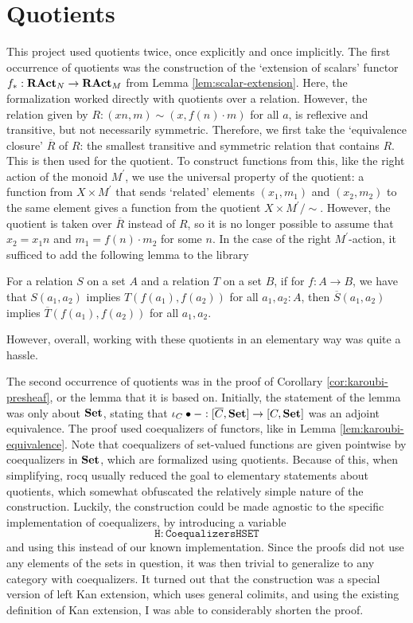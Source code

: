 \section{Quotients}\label{sec:quotients}
This project used quotients twice, once explicitly and once implicitly. The first occurrence of quotients was the construction of the `extension of scalars' functor $ f_*: \mathbf{RAct}_{N} \to \mathbf{RAct}_{M} $ from Lemma \ref{lem:scalar-extension}. Here, the formalization worked directly with quotients over a relation. However, the relation given by $ R : (x n, m) \sim (x, f(n) \cdot m) $ for all $ a $, is reflexive and transitive, but not necessarily symmetric. Therefore, we first take the `equivalence closure' $ \overline R $ of $ R $: the smallest transitive and symmetric relation that contains $ R $. This is then used for the quotient. To construct functions from this, like the right action of the monoid $ M^\prime $, we use the universal property of the quotient: a function from $ X \times M^\prime $ that sends `related' elements $ (x_1, m_1) $ and $ (x_2, m_2) $ to the same element gives a function from the quotient $ X \times M^\prime / \sim $. However, the quotient is taken over $ \overline R $ instead of $ R $, so it is no longer possible to assume that $ x_2 = x_1 n $ and $ m_1 = f(n) \cdot m_2 $ for some $ n $. In the case of the right $ M^\prime $-action, it sufficed to add the following lemma to the library
\begin{lemma}
  For a relation $ S $ on a set $ A $ and a relation $ T $ on a set $ B $, if for $ f: A \to B $, we have that $ S(a_1, a_2) $ implies $ T(f(a_1), f(a_2)) $ for all $ a_1, a_2 : A $, then $ \overline S(a_1, a_2) $ implies $ \overline T(f(a_1), f(a_2)) $ for all $ a_1, a_2 $.
\end{lemma}
However, overall, working with these quotients in an elementary way was quite a hassle.

The second occurrence of quotients was in the proof of Corollary \ref{cor:karoubi-presheaf}, or the lemma that it is based on. Initially, the statement of the lemma was only about $ \mathbf{Set} $, stating that $ \iota_C \bullet - : [\overline C, \mathbf{Set}] \to [C, \mathbf{Set}] $ was an adjoint equivalence. The proof used coequalizers of functors, like in Lemma \ref{lem:karoubi-equivalence}. Note that coequalizers of set-valued functions are given pointwise by coequalizers in $ \mathbf{Set} $, which are formalized using quotients. Because of this, when simplifying, rocq usually reduced the goal to elementary statements about quotients, which somewhat obfuscated the relatively simple nature of the construction. Luckily, the construction could be made agnostic to the specific implementation of coequalizers, by introducing a variable
\[ \mathtt{H : Coequalizers HSET} \]
and using this instead of our known implementation. Since the proofs did not use any elements of the sets in question, it was then trivial to generalize to any category with coequalizers. It turned out that the construction was a special version of left Kan extension, which uses general colimits, and using the existing definition of Kan extension, I was able to considerably shorten the proof.

